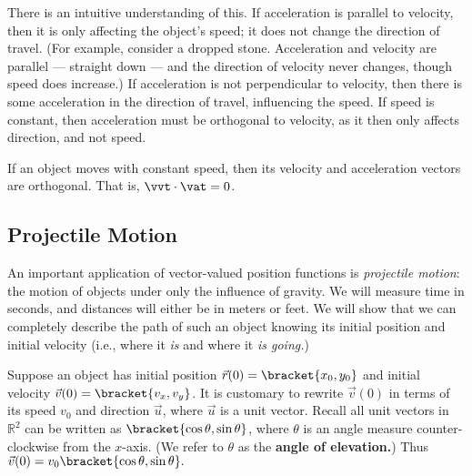 There is an intuitive understanding of this. If acceleration is parallel to velocity, then it is only affecting the object's speed; it does not change the direction of travel. (For example, consider a dropped stone. Acceleration and velocity are parallel --- straight down --- and the direction of velocity never changes, though speed does increase.) If acceleration is not perpendicular to velocity, then there is some acceleration in the direction of travel, influencing the speed. If speed is constant, then acceleration must be orthogonal to velocity, as it then only affects direction, and not speed.

{If an object moves with constant speed, then its velocity and acceleration vectors are orthogonal. That is, $\vvt\cdot\vat=0$.
}


\subsection{Projectile Motion}

An important application of vector-valued position functions is \emph{projectile motion}: the motion of objects under only the influence of gravity. We will measure time in seconds, and distances will either be in meters or feet. We will show that we can completely describe the path of such an object knowing its initial position and initial velocity (i.e., where it \emph{is} and where it \emph{is going.})

Suppose an object has initial position $\vec r(0) =\bracket{x_0,y_0}$ and initial velocity $\vec v(0) =\bracket{v_x,v_y}$. It is customary to rewrite $\vec v(0)$ in terms of its speed $v_0$ and direction $\vec u$, where $\vec u$ is a unit vector. Recall all unit vectors in $\mathbb{R}^2$ can be written as $\bracket{\cos \theta,\sin \theta}$, where $\theta$ is an angle measure counter-clockwise from the $x$-axis. (We refer to $\theta$ as the \textbf{angle of elevation.}) Thus $\vec v(0) = v_0\bracket{\cos \theta,\sin \theta}.$ 


